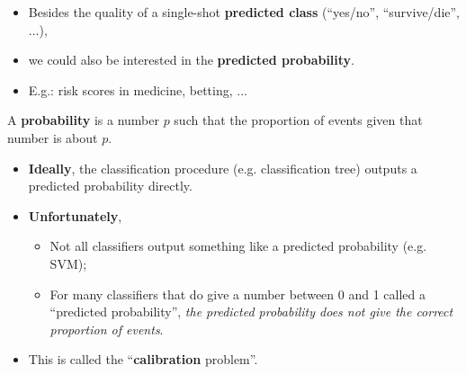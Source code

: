 \documentclass[xcolor=table,aspectratio=169]{beamer}
\begin{document}
\begin{frame}
	\begin{itemize}
		\item Besides the quality of a single-shot \textbf{predicted class}
		(``yes/no'', ``survive/die'', ...),
		\item we could also be interested in the \textbf{predicted
			probability}.
		\item E.g.: risk scores in medicine, betting, ...
	\end{itemize}
\end{frame}
\begin{frame}
	\begin{definition}
		A \textbf{probability} is a number $p$ such that the proportion of events
		given that number is about $p$.
	\end{definition}
	
	\begin{itemize}
		\item \textbf{Ideally}, the classification procedure (e.g. classification tree) outputs a predicted probability directly.
		\item \textbf{Unfortunately},
		\begin{itemize}
			\item Not all classifiers output something like a predicted
			probability (e.g. SVM);
			\item For many classifiers that do give a number between 0 and 1
			called a ``predicted probability'', \emph{the predicted
				probability does not give the correct proportion of events}.
		\end{itemize}
		\item This is called the ``\textbf{calibration} problem''.
	\end{itemize}
\end{frame}
\end{document}

